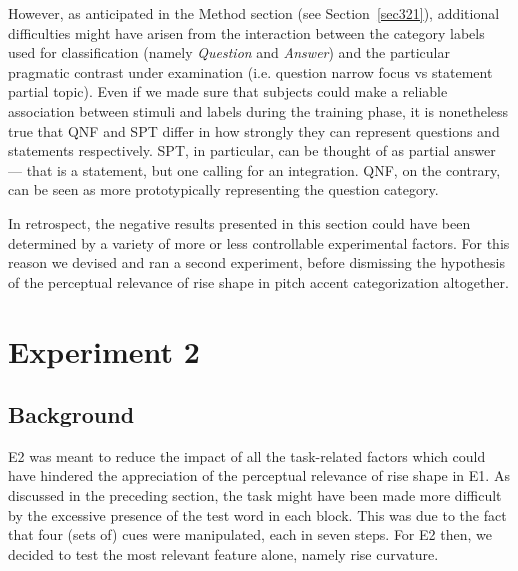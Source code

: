 However, as anticipated in the Method section (see Section~\ref{sec321}), additional difficulties might have arisen from the interaction between the category labels used for classification (namely \textit{Question} and \textit{Answer}) and the particular pragmatic contrast under examination (i.e. question narrow focus vs statement partial topic). Even if we made sure that subjects could make a reliable association between stimuli and labels during the training phase, it is nonetheless true that QNF and SPT differ in how strongly they can represent questions and statements respectively. SPT, in particular, can be thought of as partial answer --- that is a statement, but one calling for an integration. QNF, on the contrary, can be seen as more prototypically representing the question category.

In retrospect, the negative results presented in this section could have been determined by a variety of more or less controllable experimental factors. For this
\enlargethispage{1em}
reason we devised and ran a second experiment, before dismissing the hypothesis of the perceptual relevance of rise shape in pitch accent categorization altogether.

\section{Experiment 2}\label{sec33}
\subsection{Background}\label{sec3300}
E2 was meant to reduce the impact of all the task-related factors which could have hindered the appreciation of the perceptual relevance of rise shape in E1. As discussed in the preceding section, the task might have been made more difficult by the excessive presence of the test word in each block. This was due to the fact that four (sets of) cues were manipulated, each in seven steps. For E2 then, we decided to test the most relevant feature alone, namely rise curvature.

